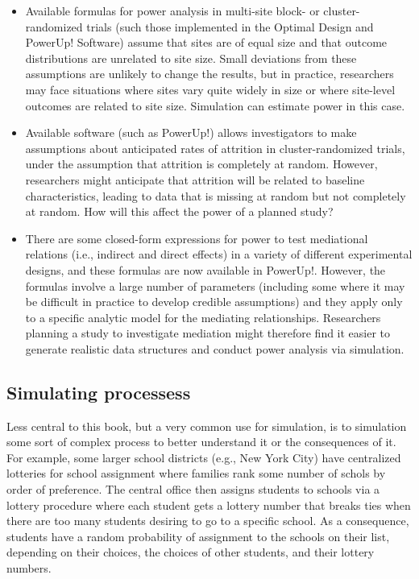\documentclass[
]{book}
\begin{document}
\begin{itemize}
\item
  Available formulas for power analysis in multi-site block- or cluster-randomized trials (such those implemented in the Optimal Design and PowerUp! Software) assume that sites are of equal size and that outcome distributions are unrelated to site size. Small deviations from these assumptions are unlikely to change the results, but in practice, researchers may face situations where sites vary quite widely in size or where site-level outcomes are related to site size. Simulation can estimate power in this case.
\item
  Available software (such as PowerUp!) allows investigators to make assumptions about anticipated rates of attrition in cluster-randomized trials, under the assumption that attrition is completely at random. However, researchers might anticipate that attrition will be related to baseline characteristics, leading to data that is missing at random but not completely at random. How will this affect the power of a planned study?
\item
  There are some closed-form expressions for power to test mediational relations (i.e., indirect and direct effects) in a variety of different experimental designs, and these formulas are now available in PowerUp!. However, the formulas involve a large number of parameters (including some where it may be difficult in practice to develop credible assumptions) and they apply only to a specific analytic model for the mediating relationships. Researchers planning a study to investigate mediation might therefore find it easier to generate realistic data structures and conduct power analysis via simulation.
\end{itemize}

\hypertarget{simulating-processess}{%
\subsection{Simulating processess}\label{simulating-processess}}

Less central to this book, but a very common use for simulation, is to simulation some sort of complex process to better understand it or the consequences of it.
For example, some larger school districts (e.g., New York City) have centralized lotteries for school assignment where families rank some number of schols by order of preference.
The central office then assigns students to schools via a lottery procedure where each student gets a lottery number that breaks ties when there are too many students desiring to go to a specific school.
As a consequence, students have a random probability of assignment to the schools on their list, depending on their choices, the choices of other students, and their lottery numbers.
\end{document}
